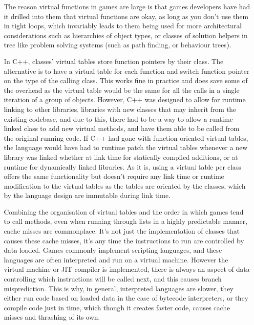 The reason virtual functions in games are large is that games developers have
had it drilled into them that virtual functions are okay, as long as you don't
use them in tight loops, which invariably leads to them being used for more
architectural considerations such as hierarchies of object types, or classes of
solution helpers in tree like problem solving systems (such as path finding, or
behaviour trees).

In C++, classes' virtual tables store function pointers by their class. The
alternative is to have a virtual table for each function and switch function
pointer on the type of the calling class. This works fine in practice and does
save some of the overhead as the virtual table would be the same for all the
calls in a single iteration of a group of objects. However, C++ was designed to
allow for runtime linking to other libraries, libraries with new classes that
may inherit from the existing codebase, and due to this, there had to be a way
to allow a runtime linked class to add new virtual methods, and have them able
to be called from the original running code. If C++ had gone with function
oriented virtual tables, the language would have had to runtime patch the
virtual tables whenever a new library was linked whether at link time for
statically compiled additions, or at runtime for dynamically linked libraries.
As it is, using a virtual table per class offers the same functionality but
doesn't require any link time or runtime modification to the virtual tables as
the tables are oriented by the classes, which by the language design are
immutable during link time.

Combining the organisation of virtual tables and the order in which games tend
to call methods, even when running through lists in a highly predictable
manner, cache misses are commonplace. It's not just the implementation of
classes that causes these cache misses, it's any time the instructions to run
are controlled by data loaded. Games commonly implement scripting languages,
and these languages are often interpreted and run on a virtual machine. However
the virtual machine or JIT compiler is implemented, there is always an aspect
of data controlling which instructions will be called next, and this causes
branch misprediction. This is why, in general, interpreted languages are
slower, they either run code based on loaded data in the case of bytecode
interpreters, or they compile code just in time, which though it creates faster
code, causes cache misses and thrashing of its own.

